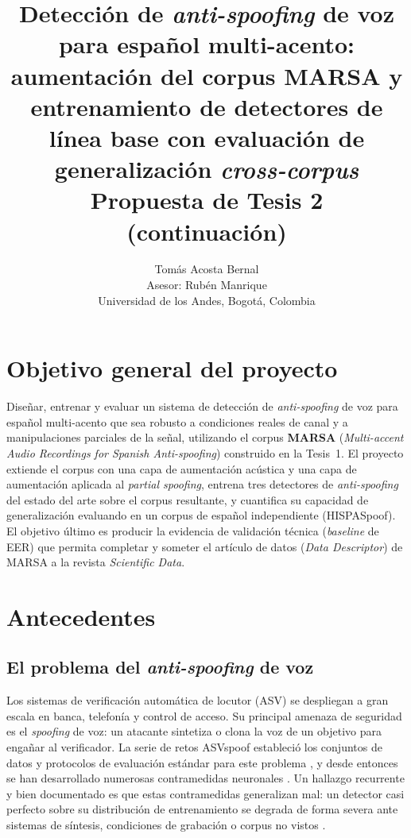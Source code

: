 \documentclass[11pt]{article}
\title{\textbf{Detecci\'on de \emph{anti-spoofing} de voz para espa\~nol
multi-acento: aumentaci\'on del corpus MARSA y entrenamiento de
detectores de l\'inea base con evaluaci\'on de generalizaci\'on
\emph{cross-corpus}}\\[6pt]
\large Propuesta de Tesis 2 (continuaci\'on)}
\author{%
Tom\'as Acosta Bernal \\
\small Asesor: Rub\'en Manrique \\
\small Universidad de los Andes, Bogot\'a, Colombia
}
\date{}
\begin{document}
\maketitle

\section{Objetivo general del proyecto}

Dise\~nar, entrenar y evaluar un sistema de detecci\'on de
\emph{anti-spoofing} de voz para espa\~nol multi-acento que sea robusto a
condiciones reales de canal y a manipulaciones parciales de la se\~nal,
utilizando el corpus \textbf{MARSA} (\emph{Multi-accent Audio Recordings
for Spanish Anti-spoofing}) construido en la Tesis~1. El proyecto
extiende el corpus con una capa de aumentaci\'on ac\'ustica y una capa de
aumentaci\'on aplicada al \emph{partial spoofing}, entrena tres
detectores de \emph{anti-spoofing} del estado del arte sobre el corpus
resultante, y cuantifica su capacidad de generalizaci\'on evaluando en un
corpus de espa\~nol independiente (HISPASpoof). El objetivo \'ultimo es
producir la evidencia de validaci\'on t\'ecnica (\emph{baseline} de EER)
que permita completar y someter el art\'iculo de datos (\emph{Data
Descriptor}) de MARSA a la revista \emph{Scientific Data}.

\section{Antecedentes}

\subsection{El problema del \emph{anti-spoofing} de voz}

Los sistemas de verificaci\'on autom\'atica de locutor (ASV) se despliegan
a gran escala en banca, telefon\'ia y control de acceso. Su principal
amenaza de seguridad es el \emph{spoofing} de voz: un atacante sintetiza
o clona la voz de un objetivo para enga\~nar al verificador. La serie de
retos ASVspoof estableci\'o los conjuntos de datos y protocolos de
evaluaci\'on est\'andar para este problema
\citep{asvspoof2019,asvspoof2021}, y desde entonces se han desarrollado
numerosas contramedidas neuronales \citep{rawnet2,aasist,tak2022ssl}. Un
hallazgo recurrente y bien documentado es que estas contramedidas
generalizan mal: un detector casi perfecto sobre su distribuci\'on de
entrenamiento se degrada de forma severa ante sistemas de s\'intesis,
condiciones de grabaci\'on o corpus no vistos
\citep{muller2022generalize,muller2024harder}.
\end{document}
